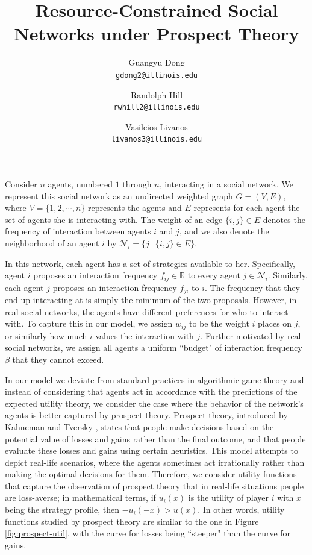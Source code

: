 \documentclass[A4paper,11pt]{article}
\author{
	{\sc Guangyu Dong} \\
	\texttt{gdong2@illinois.edu}
	\and
	{\sc Randolph Hill} \\
	\texttt{rwhill2@illinois.edu}
	\and
	{\sc Vasileios Livanos} \\
	\texttt{livanos3@illinois.edu}
}
\title{
Resource-Constrained Social Networks under Prospect Theory
}
\date{}
\begin{document}
 \maketitle

\par Consider $n$ agents, numbered $1$ through $n$, interacting in a social network. We represent this social network as
an undirected weighted graph $G = (V, E)$, where $V = \{ 1, 2, \cdots, n \}$ represents the agents and $E$ represents
for each agent the set of agents she is interacting with. The weight of an edge $\{ i, j \} \in E$ denotes the frequency of
interaction between agents $i$ and $j$, and we also denote the neighborhood of an agent $i$ by
$\mathcal{N}_i = \big\{ j \: | \: \{ i, j \} \in E \big\}$.

\par In this network, each agent has a set of strategies available to her. Specifically, agent $i$ proposes an
interaction frequency $f_{ij} \in \mathbb{R}$ to every agent $j \in \mathcal{N}_i$. Similarly, each agent $j$ proposes an
interaction frequency $f_{ji}$ to $i$. The frequency that they end up interacting at is simply the minimum of the two
proposals. However, in real social networks, the agents have different preferences for who to interact with. To capture this
in our model, we assign $w_{ij}$ to be the weight $i$ places on $j$, or similarly how much $i$ values the interaction with $j$.
Further motivated by real social networks, we assign all agents a uniform ``budget" of interaction frequency $\beta$ that they
cannot exceed.

\par In our model we deviate from standard practices in algorithmic game theory and instead of considering that agents act
in accordance with the predictions of the expected utility theory, we consider the case where the behavior of the network's
agents is better captured by prospect theory. Prospect theory, introduced by Kahneman and Tversky \cite{KT}, states that people
make decisions based on the potential value of losses and gains rather than the final outcome, and that people evaluate these
losses and gains using certain heuristics. This model attempts to depict real-life scenarios, where the agents sometimes act
irrationally rather than making the optimal decisions for them. Therefore, we consider utility functions that capture the
observation of prospect theory that in real-life situations people are loss-averse; in mathematical terms, if $u_i(x)$ is the
utility of player $i$ with $x$ being the strategy profile, then $- u_i(-x) > u(x)$. In other words, utility functions studied
by prospect theory are similar to the one in Figure \ref{fig:prospect-util}, with the curve for losses being ``steeper" than
the curve for gains.
\end{document}
